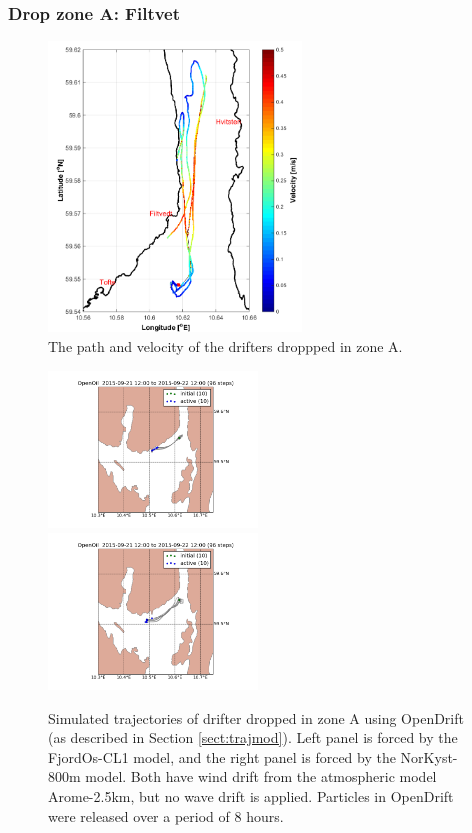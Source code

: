 \documentclass[12pt,a4paper,english]{article}
\begin{document}
\subsubsection{Drop zone A: Filtvet}
%
\begin{figure}[ht]
\centerline{
\includegraphics*[width=0.6\textwidth]{Figurer/zoneA}}
\caption{\small
The path and velocity of the drifters droppped in zone A.%
}
\label{fig:ZoneA}
\end{figure}
%
\begin{figure}[ht]
\centerline{
\includegraphics*[width=0.495\textwidth]{Opendrift_simulations/dropzone_A_no1_fjordos_arome}
\includegraphics*[width=0.495\textwidth]{Opendrift_simulations/dropzone_A_no1_norkyst_arome}
}
\caption{\small
Simulated trajectories of drifter dropped in zone A using OpenDrift (as described in Section \ref{sect:trajmod}). Left panel is forced by the FjordOs-CL1 model, and the right panel is forced by the NorKyst-800m model. Both have wind drift from the atmospheric model Arome-2.5km, but no wave drift is applied. Particles in OpenDrift were released over a period of 8 hours.
}
\label{fig:opendriftA}
\end{figure}
\end{document}
